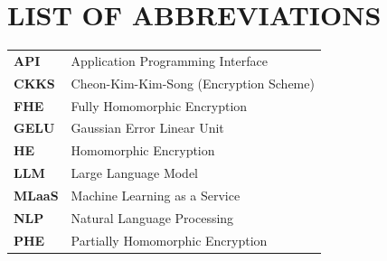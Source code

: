 \chapter*{LIST OF ABBREVIATIONS}

\noindent

\begin{tabular}{@{}p{3cm}p{11.5cm}@{}}
\textbf{API}   & Application Programming Interface \\
\textbf{CKKS}  & Cheon-Kim-Kim-Song (Encryption Scheme) \\
\textbf{FHE}   & Fully Homomorphic Encryption \\
\textbf{GELU}  & Gaussian Error Linear Unit \\
\textbf{HE}    & Homomorphic Encryption \\
\textbf{LLM}   & Large Language Model \\
\textbf{MLaaS} & Machine Learning as a Service \\
\textbf{NLP}   & Natural Language Processing \\
\textbf{PHE}   & Partially Homomorphic Encryption \\
\end{tabular}